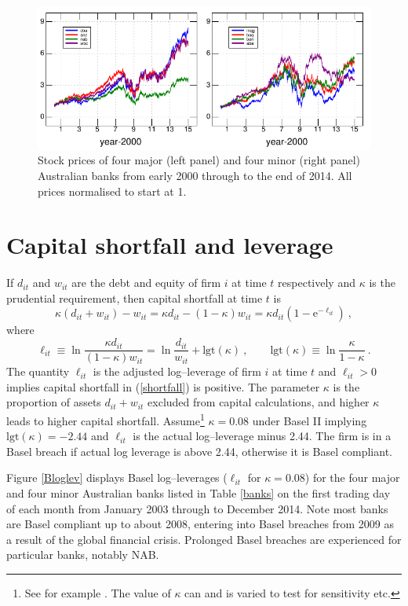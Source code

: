 \documentclass[authoryear]{elsarticle}
\newcommand{\logit}{\mathrm{lgt}}
\newcommand{\e}{\mathrm{e}}
\newcommand{\eref}[1]{(\ref{#1})}
\newcommand{\fref}[1]{Figure \ref{#1}}
\newcommand{\tref}[1]{Table \ref{#1}}
\newcommand{\cq}{\ , \qquad}
\newcommand{\be}[1]{\begin{equation}\label{#1}}
\newcommand{\ee}{\end{equation}}
\begin{document}
\begin{figure}[htbp]
\begin{center}
\includegraphics{figures/prices.pdf}
\caption{Stock  prices of four major (left panel) and four minor (right panel) Australian banks from early 2000 through to the end of 2014.  All prices normalised to start at 1.}
\label{prices}
\end{center}
\end{figure}




\section{Capital shortfall and leverage}\label{capshort}

If $d_{it}$ and $w_{it}$ are the debt and equity of firm $i$ at time $t$ respectively and $\kappa$ is the prudential requirement,  then  capital shortfall at time $t$ is
\be{shortfall}
\kappa(d_{it}+w_{it}) - w_{it} = \kappa d_{it}  - (1-\kappa) w_{it} = \kappa d_{it}\left(1-\e^{-\ell_{it}}\right)\ ,
\ee
where
$$
\ell_{it} \equiv  \ln\frac{\kappa d_{it}}{(1-\kappa)w_{it}}= \ln\frac{d_{it}}{w_{it}}+\logit(\kappa) \cq \logit(\kappa)\equiv \ln \frac{\kappa}{1-\kappa} \ .
$$
The quantity $\ell_{it}$ is the adjusted log--leverage of firm $i$ at time $t$ and $\ell_{it}>0$ implies capital shortfall in \eref{shortfall} is positive. The parameter $\kappa$ is the proportion of assets $d_{it}+w_{it}$ excluded from capital calculations, and higher $\kappa$ leads to higher capital shortfall.
Assume\footnote{See for example \cite{brownlees2015}.   The value of $\kappa$ can and is varied to test for sensitivity etc.} $\kappa=0.08$ under Basel II implying $\logit(\kappa)=-2.44$ and  $\ell_{it}$ is the actual log--leverage minus 2.44.
The firm is in a Basel breach if actual  log leverage is above 2.44, otherwise it is Basel compliant.

\fref{Bloglev} displays Basel log--leverages ($\ell_{it}$ for $\kappa=0.08$) for the four major and four minor Australian banks listed in \tref{banks} on the first trading day of each month from January 2003  through to December 2014.  Note most banks are Basel compliant up to about 2008, entering into Basel breaches from 2009 as a result of the global financial crisis. Prolonged Basel breaches are experienced for particular banks, notably NAB.
\end{document}
